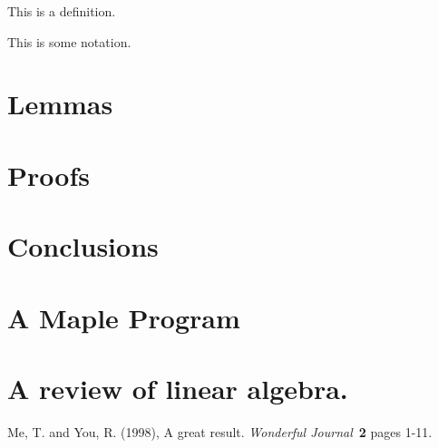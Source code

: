 \documentclass[12pt]{report}
\begin{document}
\begin{definition}
This is a definition.
\end{definition}

\begin{notation}
This is some notation.
\end{notation}


    \chapter{Lemmas}
    \chapter{Proofs}
    \chapter{Conclusions}
    \appendix
    \chapter{A Maple Program}
    \chapter{A review of linear algebra.}
\begin{thebibliography}{AAA}
 Me, T. and You, R. (1998),
	      A great result. {\em Wonderful Journal}\ {\bf 2}
	      pages 1-11.
\end{thebibliography}
%    
%    
\end{document}
